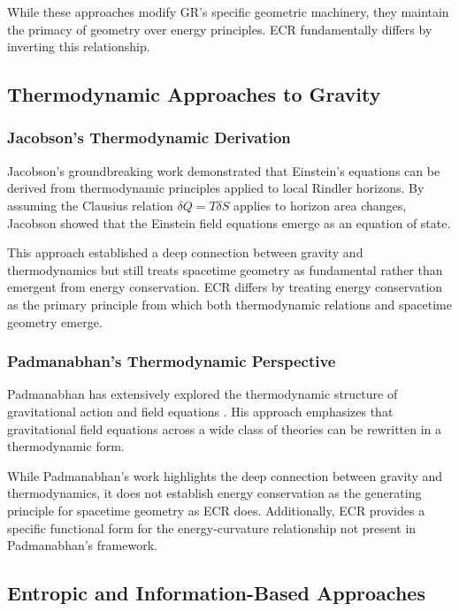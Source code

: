 \documentclass[11pt,a4paper]{article}
\begin{document}
While these approaches modify GR's specific geometric machinery, they maintain the primacy of geometry over energy principles. ECR fundamentally differs by inverting this relationship.

\subsection{Thermodynamic Approaches to Gravity}

\subsubsection{Jacobson's Thermodynamic Derivation}

Jacobson's groundbreaking work \cite{jacobson1995} demonstrated that Einstein's equations can be derived from thermodynamic principles applied to local Rindler horizons. By assuming the Clausius relation $\delta Q = T\delta S$ applies to horizon area changes, Jacobson showed that the Einstein field equations emerge as an equation of state.

This approach established a deep connection between gravity and thermodynamics but still treats spacetime geometry as fundamental rather than emergent from energy conservation. ECR differs by treating energy conservation as the primary principle from which both thermodynamic relations and spacetime geometry emerge.

\subsubsection{Padmanabhan's Thermodynamic Perspective}

Padmanabhan has extensively explored the thermodynamic structure of gravitational action and field equations \cite{padmanabhan2010, padmanabhan2010book}. His approach emphasizes that gravitational field equations across a wide class of theories can be rewritten in a thermodynamic form.

While Padmanabhan's work highlights the deep connection between gravity and thermodynamics, it does not establish energy conservation as the generating principle for spacetime geometry as ECR does. Additionally, ECR provides a specific functional form for the energy-curvature relationship not present in Padmanabhan's framework.

\subsection{Entropic and Information-Based Approaches}
\end{document}
